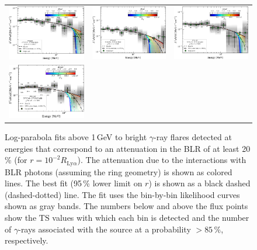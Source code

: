 \documentclass[twocolumn]{aastex62}
\newcommand{\Grays}{$\gamma$-rays\xspace}
\newcommand{\gray}{$\gamma$-ray\xspace}
\begin{document}
\begin{figure}
\begin{tabular}{ccc}
    \includegraphics[width=0.32\linewidth]{sed_CTA102_t002_LogParabola_3min_ring_emin1000.pdf} & 
    \includegraphics[width=0.32\linewidth]{sed_CTA102_t003_LogParabola_3min_ring_emin1000.pdf} & 
    \includegraphics[width=0.32\linewidth]{sed_CTA102_t004_LogParabola_3min_ring_emin1000.pdf}\\
    \includegraphics[width=0.32\linewidth]{sed_CTA102_t001_LogParabola_3min_ring_emin1000.pdf}
    \end{tabular}

    \caption{Log-parabola fits above 1\,GeV to bright \gray flares detected at energies that correspond to an attenuation in the BLR of at least 20\,\% (for $r = 10^{-2}R_{\mathrm{Ly}\alpha}$). The attenuation due to the interactions with BLR photons (assuming the ring geometry) is shown as colored lines. The best fit (95\,\% lower limit on $r$) is shown as a black dashed (dashed-dotted) line. 
    The fit uses the bin-by-bin likelihood curves shown as gray bands. The numbers below and above the flux points show the $\mathrm{TS}$ values  with which each bin is detected and the number of \Grays associated with the source at a probability $>85\,\%$, respectively.}
    \label{fig:seds}
\end{figure}
\end{document}
